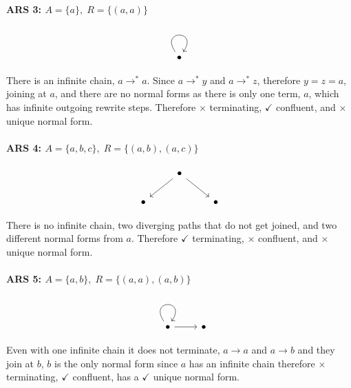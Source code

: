 \documentclass{article}
\theoremstyle{theorem}
\theoremstyle{definition}
\theoremstyle{remark}
\begin{document}
\paragraph{ARS 3: $A=\{a\},\; R=\{(a,a)\}$}

\[\begin{tikzcd}
	\bullet
	\arrow[from=1-1, to=1-1, loop, in=55, out=125, distance=10mm]
\end{tikzcd}\]

There is an infinite chain, $a \to^* a$. Since $a \to^* y$ and $a \to^* z$, therefore $y = z = a$, joining at $a$, and there are no normal forms as there is only one term, $a$, which has infinite outgoing rewrite steps. Therefore $\times$ terminating, $\checkmark$ confluent, and $\times$ unique normal form.

\paragraph{ARS 4: $A=\{a,b,c\},\; R=\{(a,b),(a,c)\}$}

\[
\begin{tikzcd}
	& \bullet \\
	\bullet && \bullet
	\arrow[from=1-2, to=2-1]
	\arrow[from=1-2, to=2-3]
\end{tikzcd}
\]

There is no infinite chain, two diverging paths that do not get joined, and two different normal forms from $a$. Therefore $\checkmark$ terminating, $\times$ confluent, and $\times$ unique normal form.

\paragraph{ARS 5: $A=\{a,b\},\; R=\{(a,a),(a,b)\}$}

\[
\begin{tikzcd}
	\bullet & \bullet
	\arrow[from=1-1, to=1-1, loop, in=55, out=125, distance=10mm]
	\arrow[from=1-1, to=1-2]
\end{tikzcd}
\]

Even with one infinite chain it does not terminate, $a\to a$ and $a\to b$ and they join at $b$, $b$ is the only normal form since $a$ has an infinite chain therefore $\times$ terminating, $\checkmark$ confluent, has a $\checkmark$ unique normal form.
\end{document}
